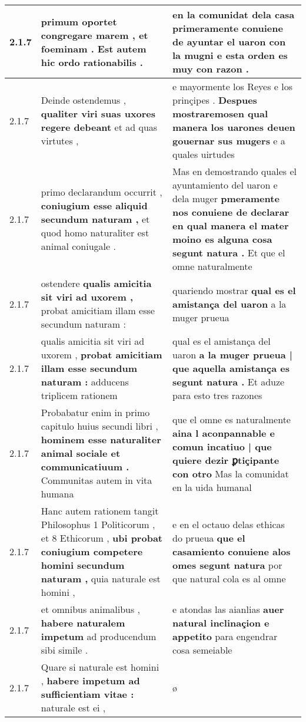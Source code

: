 \begin{tabular}{|p{1cm}|p{6.5cm}|p{6.5cm}|}
2.1.7 & primum oportet \textbf{ congregare marem , et foeminam . } Est autem hic ordo rationabilis . & en la comunidat dela casa \textbf{ primeramente conuiene de ayuntar el uaron con la mugni } e esta orden es muy con razon . \\\hline
2.1.7 & Deinde ostendemus , \textbf{ qualiter viri suas uxores regere debeant } et ad quas virtutes , & e mayormente los Reyes e los prinçipes . \textbf{ Despues mostraremosen qual manera los uarones deuen gouernar sus mugers } e a quales uirtudes \\\hline
2.1.7 & primo declarandum occurrit , \textbf{ coniugium esse aliquid secundum naturam , } et quod homo naturaliter est animal coniugale . & Mas en demostrando quales el ayuntamiento del uaron e dela muger \textbf{ pmeramente nos conuiene de declarar en qual manera el mater moino es alguna cosa segunt natura . } Et que el omne naturalmente \\\hline
2.1.7 & ostendere \textbf{ qualis amicitia sit viri ad uxorem , } probat amicitiam illam esse secundum naturam : & quariendo mostrar \textbf{ qual es el amistança del uaron } a la muger prueua \\\hline
2.1.7 & qualis amicitia sit viri ad uxorem , \textbf{ probat amicitiam illam esse secundum naturam : } adducens triplicem rationem & qual es el amistança del uaron \textbf{ a la muger prueua | que aquella amistança es segunt natura . } Et aduze para esto tres razones \\\hline
2.1.7 & Probabatur enim in primo capitulo huius secundi libri , \textbf{ hominem esse naturaliter animal sociale et communicatiuum . } Communitas autem in vita humana & que el omne es naturalmente \textbf{ aina l aconpannable e comun incatiuo | que quiere dezir ꝑtiçipante con otro } Mas la comunidat en la uida humanal \\\hline
2.1.7 & Hanc autem rationem tangit Philosophus 1 Politicorum , et 8 Ethicorum , \textbf{ ubi probat coniugium competere homini secundum naturam , } quia naturale est homini , & e en el octauo delas ethicas do prueua \textbf{ que el casamiento conuiene alos omes segunt natura } por que natural cola es al omne \\\hline
2.1.7 & et omnibus animalibus , \textbf{ habere naturalem impetum } ad producendum sibi simile . & e atondas las aianlias \textbf{ auer natural inclinaçion e appetito } para engendrar cosa semeiable \\\hline
2.1.7 & Quare si naturale est homini , \textbf{ habere impetum ad sufficientiam vitae : } naturale est ei , & ø \\\hline

\end{tabular}
